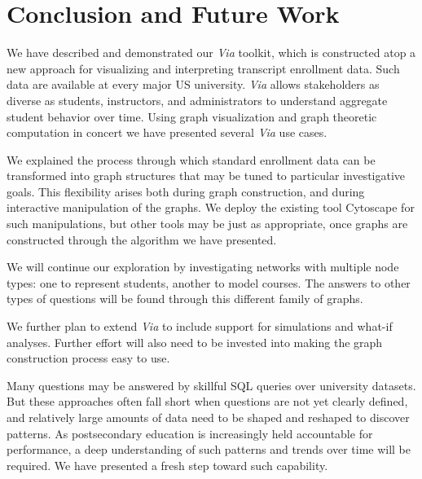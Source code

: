 \section{Conclusion and Future Work}
\label{sec:conclusion}
We have described and demonstrated our {\em Via} toolkit, which is
constructed atop a new approach for visualizing and interpreting
transcript enrollment data. Such data are available at every major
US university. {\em Via} allows stakeholders as diverse as
students, instructors, and administrators to understand aggregate
student behavior over time. Using graph visualization and graph
theoretic computation in concert we have presented several {\em Via}
use cases.

We explained the process through which standard enrollment data can be
transformed into graph structures that may be tuned to particular
investigative goals. This flexibility arises both during graph
construction, and during interactive manipulation of the
graphs. We deploy the existing tool Cytoscape for such
manipulations, but other tools may be just as appropriate, once graphs
are constructed through the algorithm we have presented.

We will continue our exploration by investigating networks with
multiple node types: one to represent students, another to model
courses. The answers to other types of questions will be found through
this different family of graphs. 

We further plan to extend {\em Via} to include support for simulations
and what-if analyses. Further effort will also need to be invested
into making the graph construction process easy to use. 

Many questions may be answered by skillful SQL queries over university
datasets. But these approaches often fall short when questions are
not yet clearly defined, and relatively large amounts of data need to
be shaped and reshaped to discover patterns. As postsecondary
education is increasingly held accountable for performance, a deep
understanding of such patterns and trends over time will be
required. We have presented a fresh step toward such capability.
